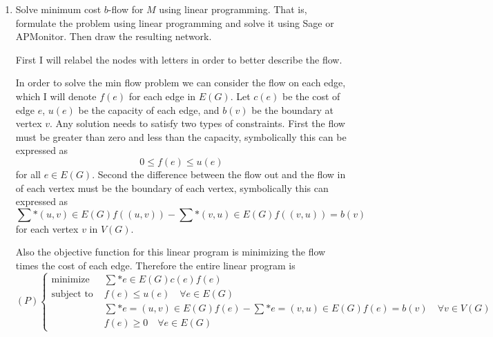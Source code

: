 \documentclass[11pt, oneside]{article}
\begin{document}
\begin{enumerate}
  \item %
    Solve minimum cost $b$-flow for $M$ using linear programming.
    That is, formulate the problem using linear programming and solve it
    using Sage or APMonitor. Then draw the resulting network.

    First I will relabel the nodes with letters in order to better describe the
    flow.
    \begin{center}
    \end{center}
    In order to solve the min flow problem we can consider the flow on each
    edge, which I will denote $f(e)$ for each edge in $E(G)$.
    Let $c(e)$ be the cost of edge $e$, $u(e)$ be the capacity of each edge,
    and $b(v)$ be the boundary at vertex $v$.
    Any solution needs to satisfy two types of constraints.
    First the flow must be greater than zero and less than the capacity,
    symbolically this can be expressed as
    \[
      0 \le f(e) \le u(e)
    \]
    for all $e \in E(G)$.
    Second the difference between the flow out and the flow in of each vertex
    must be the boundary of each vertex, symbolically this can expressed as
    \[
      \sum*{(u, v) \in E(G)}{}{f((u, v))} - \sum*{(v, u) \in E(G)}{}{f((v, u))} = b(v)
    \]
    for each vertex $v$ in $V(G)$.

    Also the objective function for this linear program is minimizing the
    flow times the cost of each edge.
    Therefore the entire linear program is
    \[
      (P)
      \begin{cases} 
        \text{minimize }   & \sum*{e \in E(G)}{}{c(e) f(e)} \\
        \text{subject to } & f(e) \le u(e) \quad \forall e \in E(G) \\
                           & \sum*{e = (u, v) \in E(G)}{}{f(e)} - \sum*{e = (v, u) \in E(G)}{}{f(e)} = b(v) \quad \forall v \in V(G) \\
                           & f(e) \ge 0 \quad \forall e \in E(G)
      \end{cases}
    \]


\end{enumerate}
\end{document}
